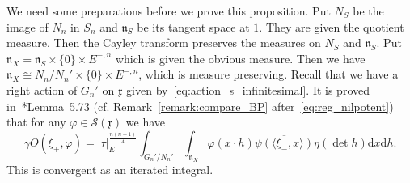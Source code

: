 \documentclass[letterpaper,11pt]{amsart}
\newcommand{\fn}{\mathfrak{n}}
\newcommand{\fx}{\mathfrak{x}}
\newcommand{\cS}{\mathcal{S}}
\newcommand{\rd}{\mathrm{d}}
\newcommand{\<}{\negthickspace}
\providecommand{\abs}[1]{\lvert#1\rvert}
\theoremstyle{definition}
\theoremstyle{plain}
\theoremstyle{remark}
\numberwithin{equation}{section}
\begin{document}
We need some preparations before we prove this proposition. 
Put $N_S$ be the image of $N_n$ in $S_n$ and $\fn_S$ be its tangent space at
$1$. They are given the quotient measure. Then the Cayley transform preserves
the measures on $N_S$ and $\fn_S$. Put $\fn_{X} = \fn_S \times \{0\} \times
E^{-,n}$ which is given the obvious measure. Then we have $\fn_{X} \cong
N_n/N_n' \times \{0\} \times E^{-,n}$, which is measure preserving. Recall
that we have a right action of $G_n'$ on $\fx$ given
by~\eqref{eq:action_s_infinitesimal}. It is proved
in~\cite{BP1}*{Lemma~5.73} (cf. Remark~\ref{remark:compare_BP}
after~\eqref{eq:reg_nilpotent}) that for any $\varphi \in \cS(\fx)$ we
have
    \begin{equation}    \label{eq:regular_nilpotent_intermediate}
    \gamma O(\xi_+, \varphi) = \abs{\tau}_E^{\frac{n(n+1)}{4}}
    \int_{G_n'/N_n'} \int_{\fn_X} \varphi(x \cdot h)
    \overline{\psi(\langle \xi_-, x \rangle)}
    \eta(\det h) \rd x \rd h.
    \end{equation}
This is convergent as an iterated integral.
\end{document}
